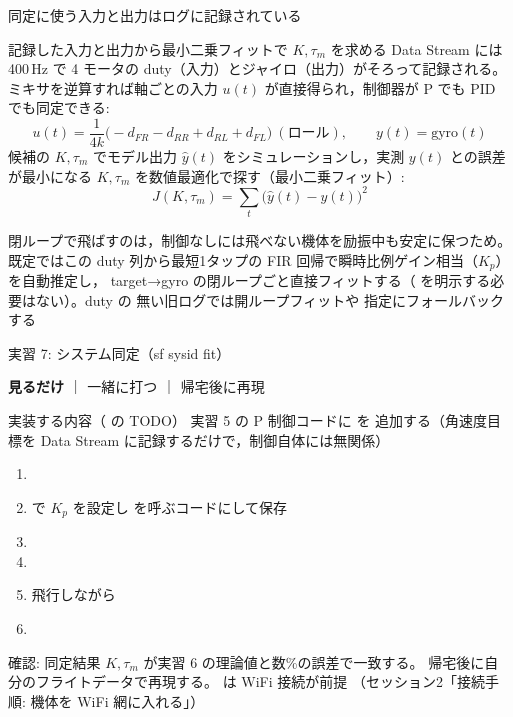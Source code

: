 \begin{frame}{同定に使う入力と出力はログに記録されている\later}
  \begin{block}{記録した入力と出力から最小二乗フィットで $K,\tau_m$ を求める}
    \footnotesize
    \setlength{\abovedisplayskip}{2pt}\setlength{\belowdisplayskip}{2pt}%
    Data Stream には 400\,Hz で 4 モータの duty（入力）とジャイロ（出力）がそろって記録される。
    ミキサを逆算すれば軸ごとの入力 $u(t)$ が直接得られ，制御器が P でも PID でも同定できる:
    \[
      u(t) = \frac{1}{4k}\bigl(-d_{FR} - d_{RR} + d_{RL} + d_{FL}\bigr)\ (\text{ロール}), \qquad
      y(t) = \text{gyro}(t)
    \]
    候補の $K,\tau_m$ でモデル出力 $\hat y(t)$ をシミュレーションし，実測
    $y(t)$ との誤差が最小になる $K,\tau_m$ を数値最適化で探す（最小二乗フィット）:
    \[
      J(K,\tau_m) = \sum_t \bigl(\hat y(t) - y(t)\bigr)^2
    \]
  \end{block}
  {\scriptsize 閉ループで飛ばすのは，制御なしには飛べない機体を励振中も安定に保つため。
  既定ではこの duty 列から最短1タップの FIR 回帰で瞬時比例ゲイン相当（$K_p$）を自動推定し，
  target→gyro の閉ループごと直接フィットする（ を明示する必要はない）。duty の
  無い旧ログでは開ループフィットや  指定にフォールバックする}
\end{frame}

\begin{frame}[fragile]{実習 7: システム同定（sf sysid fit）}
  \vspace{0.15em}

  {\footnotesize \textcolor{sfblue}{\textbf{見るだけ}} ｜ 一緒に打つ ｜ 帰宅後に再現}

  \vspace{0.3em}

  \begin{block}{実装する内容（ の TODO）}\footnotesize
    実習 5 の P 制御コードに  を
    追加する（角速度目標を Data Stream に記録するだけで，制御自体には無関係）
  \end{block}

  \begin{enumerate}\footnotesize\setlength{\itemsep}{0pt}
    \item {}
    \item {} で $K_p$ を設定し  を呼ぶコードにして保存
    \item {}
    \item {}
    \item 飛行しながら 
    \item {}
  \end{enumerate}

  {\footnotesize 確認: 同定結果 $K,\tau_m$ が実習 6 の理論値と数\%の誤差で一致する。
  帰宅後に自分のフライトデータで再現する。 は WiFi 接続が前提
  （セッション2「接続手順: 機体を WiFi 網に入れる」）}
\end{frame}

